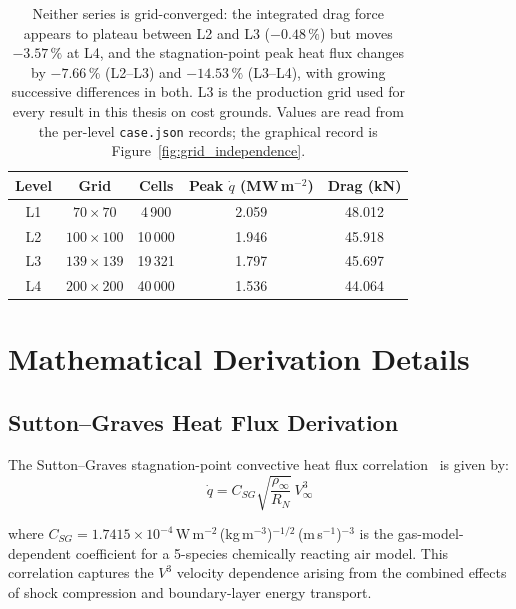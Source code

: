 \begin{table}[H]
\centering
\caption{Grid independence study: surface quantities across four refinement levels.}
\label{tab:grid_study}
\begin{tabular}{ccccc}
\hline
\textbf{Level} & \textbf{Grid} & \textbf{Cells} & \textbf{Peak $\dot q$ (MW\,m$^{-2}$)} & \textbf{Drag (kN)} \\
\hline
L1 & $70\times70$ & 4\,900 & 2.059 & 48.012 \\
L2 & $100\times100$ & 10\,000 & 1.946 & 45.918 \\
L3 & $139\times139$ & 19\,321 & 1.797 & 45.697 \\
L4 & $200\times200$ & 40\,000 & 1.536 & 44.064 \\
\hline
\end{tabular}
\caption*{Neither series is grid-converged: the integrated drag force appears to plateau between L2 and L3 ($-0.48\,\%$) but moves $-3.57\,\%$ at L4, and the stagnation-point peak heat flux changes by $-7.66\,\%$ (L2--L3) and $-14.53\,\%$ (L3--L4), with growing successive differences in both. L3 is the production grid used for every result in this thesis on cost grounds. Values are read from the per-level \texttt{case.json} records; the graphical record is Figure~\ref{fig:grid_independence}.}
\end{table}

\chapter{Mathematical Derivation Details}
\label{app:derivations}

\section{Sutton--Graves Heat Flux Derivation}

The Sutton--Graves stagnation-point convective heat flux correlation~\cite{sutton1971gravesh} is given by:
\begin{equation}
    \dot{q} = C_{SG} \sqrt{\frac{\rho_\infty}{R_N}} \, V_\infty^3
    \label{eq:sg_derivation}
\end{equation}

\noindent where $C_{SG} = 1.7415 \times 10^{-4}$\,W\,m$^{-2}$\,(kg\,m$^{-3}$)$^{-1/2}$\,(m\,s$^{-1}$)$^{-3}$ is the gas-model-dependent coefficient for a 5-species chemically reacting air model. This correlation captures the $V^3$ velocity dependence arising from the combined effects of shock compression and boundary-layer energy transport.


